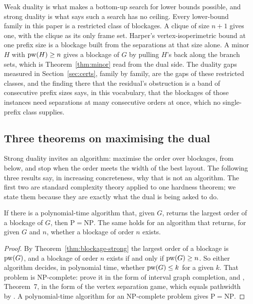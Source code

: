 Weak duality is what makes a bottom-up search for lower bounds possible, and
strong duality is what says such a search has no ceiling. Every lower-bound
family in this paper is a restricted class of blockages. A clique of size
$n+1$ gives one, with the clique as its only frame set. Harper's
vertex-isoperimetric bound at one prefix size is a blockage built from the
separations at that size alone. A minor $H$ with $\mathrm{pw}(H)\ge n$ gives a
blockage of $G$ by pulling $H$'s back along the branch sets, which is
Theorem~\ref{thm:minor} read from the dual side. The duality gaps measured in
Section~\ref{sec:certs}, family by family, are the gaps of these restricted
classes, and the finding there that the residual's obstruction is a band of
consecutive prefix sizes says, in this vocabulary, that the blockages of those
instances need separations at many consecutive orders at once, which no
single-prefix class supplies.

\subsection{Three theorems on maximising the dual}

Strong duality invites an algorithm: maximise the order over blockages, from
below, and stop when the order meets the width of the best layout. The
following three results say, in increasing concreteness, why that is not an
algorithm. The first two are standard complexity theory applied to one
hardness theorem; we state them because they are exactly what the dual is
being asked to do.

\begin{theorem}\label{thm:dual-np}
If there is a polynomial-time algorithm that, given $G$, returns the largest
order of a blockage of $G$, then $\mathrm P=\mathrm{NP}$. The same holds for
an algorithm that returns, for given $G$ and $n$, whether a blockage of order
$n$ exists.
\end{theorem}
\begin{proof}
By Theorem~\ref{thm:blockage-strong} the largest order of a blockage is
$\mathrm{pw}(G)$, and a blockage of order $n$ exists if and only if $\mathrm{pw}(G)\ge n$. So
either algorithm decides, in polynomial time, whether $\mathrm{pw}(G)\le k$ for a
given $k$. That problem is NP-complete: \citet{LY2002ref5} prove it in the
form of interval graph completion, and \citet{LY2002ref14}, Theorem~7, in
the form of the vertex separation game, which equals pathwidth by
\citet{LY2002ref13}. A polynomial-time algorithm for an NP-complete problem
gives $\mathrm P=\mathrm{NP}$.
\end{proof}

